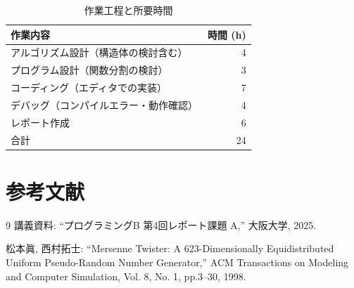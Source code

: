 \documentclass[a4paper,11pt]{jsarticle}
\begin{document}
\begin{table}[h]
\centering
\caption{作業工程と所要時間}
\begin{tabular}{lr}
\toprule
作業内容 & 時間 (h) \\
\midrule
アルゴリズム設計（構造体の検討含む） & 4 \\
プログラム設計（関数分割の検討） & 3 \\
コーディング（エディタでの実装） & 7 \\
デバッグ（コンパイルエラー・動作確認） & 4 \\
レポート作成 & 6 \\
\midrule
合計 & 24 \\
\bottomrule
\end{tabular}
\end{table}

\section{参考文献}
\begin{thebibliography}{9}
     講義資料: ``プログラミングB 第4回レポート課題 A,'' 大阪大学, 2025.
    
     松本眞, 西村拓士: ``Mersenne Twister: A 623-Dimensionally Equidistributed Uniform Pseudo-Random Number Generator,'' ACM Transactions on Modeling and Computer Simulation, Vol. 8, No. 1, pp.3–30, 1998.
\end{thebibliography}

\newpage
\appendix
\end{document}
